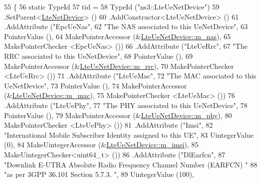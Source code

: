 \begin{DoxyCode}
55 \{
56   \textcolor{keyword}{static} TypeId
57     tid =
58     TypeId (\textcolor{stringliteral}{"ns3::LteUeNetDevice"})
59     .SetParent<\hyperlink{classns3_1_1LteNetDevice_a6e36295fe539e3936ffbf81a260c4d24}{LteNetDevice}> ()
60     .AddConstructor<LteUeNetDevice> ()
61     .AddAttribute (\textcolor{stringliteral}{"EpcUeNas"},
62                    \textcolor{stringliteral}{"The NAS associated to this UeNetDevice"},
63                    PointerValue (),
64                    MakePointerAccessor (&\hyperlink{classns3_1_1LteUeNetDevice_ab48155d7243e9591a027ce6f6294587f}{LteUeNetDevice::m\_nas}),
65                    MakePointerChecker <EpcUeNas> ())
66     .AddAttribute (\textcolor{stringliteral}{"LteUeRrc"},
67                    \textcolor{stringliteral}{"The RRC associated to this UeNetDevice"},
68                    PointerValue (),
69                    MakePointerAccessor (&\hyperlink{classns3_1_1LteUeNetDevice_a180bf4a8613e55bd2863045f607703dd}{LteUeNetDevice::m\_rrc}),
70                    MakePointerChecker <LteUeRrc> ())
71     .AddAttribute (\textcolor{stringliteral}{"LteUeMac"},
72                    \textcolor{stringliteral}{"The MAC associated to this UeNetDevice"},
73                    PointerValue (),
74                    MakePointerAccessor (&\hyperlink{classns3_1_1LteUeNetDevice_a5561b995d1cd375051f4d3215572bab1}{LteUeNetDevice::m\_mac}),
75                    MakePointerChecker <LteUeMac> ())
76     .AddAttribute (\textcolor{stringliteral}{"LteUePhy"},
77                    \textcolor{stringliteral}{"The PHY associated to this UeNetDevice"},
78                    PointerValue (),
79                    MakePointerAccessor (&\hyperlink{classns3_1_1LteUeNetDevice_a87f71c630d166519bf1b712de30f5f77}{LteUeNetDevice::m\_phy}),
80                    MakePointerChecker <LteUePhy> ())
81     .AddAttribute (\textcolor{stringliteral}{"Imsi"},
82                    \textcolor{stringliteral}{"International Mobile Subscriber Identity assigned to this UE"},
83                    UintegerValue (0),
84                    MakeUintegerAccessor (&\hyperlink{classns3_1_1LteUeNetDevice_a27e4a8e6e090100b71acb158e5320ee5}{LteUeNetDevice::m\_imsi}),
85                    MakeUintegerChecker<uint64\_t> ())
86     .AddAttribute (\textcolor{stringliteral}{"DlEarfcn"},
87                    \textcolor{stringliteral}{"Downlink E-UTRA Absolute Radio Frequency Channel Number (EARFCN) "}
88                    \textcolor{stringliteral}{"as per 3GPP 36.101 Section 5.7.3. "},
89                    UintegerValue (100),

\end{DoxyCode}
